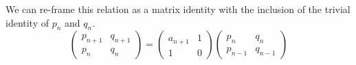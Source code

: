 \documentclass{article}
\theoremstyle{remark}
\theoremstyle{definition}
\begin{document}
We can re-frame this relation as a matrix identity with the inclusion of the trivial identity of $p_n$ and $q_n$.
\begin{equation}\label{convergents.indentity.matrix}
    \begin{pmatrix}
    p_{n+1} & q_{n+1}\\
    p_{n} & q_{n}
    \end{pmatrix}
    =
    \begin{pmatrix}
    a_{n+1} & 1\\
    1 & 0
    \end{pmatrix}
    \begin{pmatrix}
    p_{n} & q_{n}\\
    p_{n-1} & q_{n-1}
    \end{pmatrix}
\end{equation}
\end{document}
